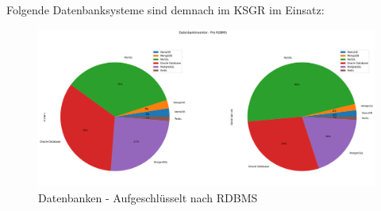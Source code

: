 \begin{flushleft}
    \recalctypearea
    Folgende Datenbanksysteme sind demnach im KSGR im Einsatz:
    
\end{flushleft}
\begin{flushleft}
    \begin{figure}[H]
        \centering
        \includegraphics[width=1\linewidth]{source/pandas_data_chart_plotter/db_inventory_per_rdbms}
        \caption{Datenbanken - Aufgeschlüsselt nach RDBMS}
        \label{fig:db_inventory_per_rdbms}
    \end{figure}
\end{flushleft}
